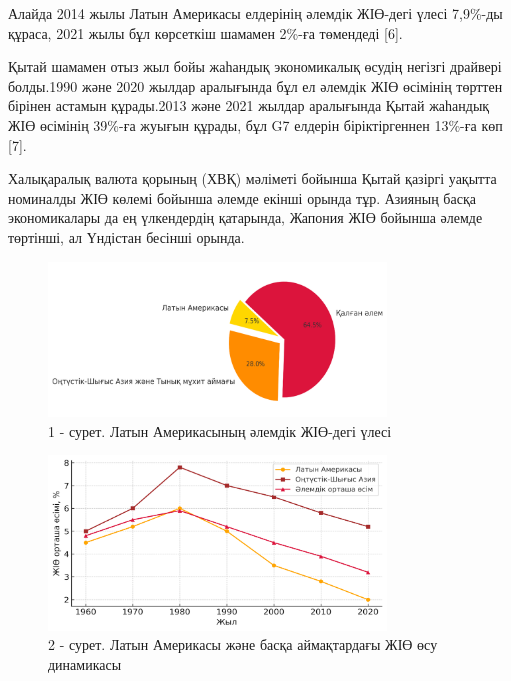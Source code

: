 \begin{multicols}{2}
Алайда 2014 жылы Латын Америкасы елдерінің әлемдік ЖІӨ-дегі үлесі
7,9\%-ды құраса, 2021 жылы бұл көрсеткіш шамамен 2\%-ға төмендеді
{[}6{]}.

Қытай шамамен отыз жыл бойы жаһандық экономикалық өсудің негізгі
драйвері болды.1990 және 2020 жылдар аралығында бұл ел әлемдік ЖІӨ
өсімінің төрттен бірінен астамын құрады.2013 және 2021 жылдар
аралығында Қытай жаһандық ЖІӨ өсімінің 39\%-ға жуығын құрады, бұл G7
елдерін біріктіргеннен 13\%-ға көп {[}7{]}.

Халықаралық валюта қорының (ХВҚ) мәліметі бойынша Қытай қазіргі уақытта
номиналды ЖІӨ көлемі бойынша әлемде екінші орында тұр. Азияның басқа
экономикалары да ең үлкендердің қатарында, Жапония ЖІӨ бойынша әлемде
төртінші, ал Үндістан бесінші орында.
\end{multicols}

\begin{figure}[H]
	\centering
	\includegraphics[width=0.8\textwidth]{media/ekon2/image51}
	\caption*{1 - сурет. Латын Америкасының әлемдік ЖІӨ-дегі үлесі}
\end{figure}

\begin{figure}[H]
	\centering
	\includegraphics[width=0.8\textwidth]{media/ekon2/image52}
	\caption*{2 - сурет. Латын Америкасы және басқа аймақтардағы ЖІӨ өсу динамикасы}
\end{figure}

